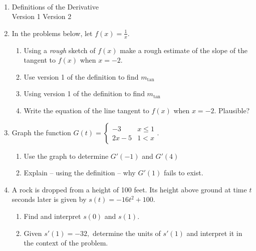 \documentclass[11pt,fleqn]{article}
\begin{document}
\renewcommand{\headrulewidth}{0pt}
\newcommand{\blank}[1]{\rule{#1}{0.75pt}}
\newcommand{\bc}{\begin{center}}
\newcommand{\ec}{\end{center}}
\renewcommand{\d}{\displaystyle}

\vspace*{-0.7in}

\begin{center}
  \large
  \\
\end{center}
\begin{enumerate}
\item Definitions of the Derivative \\
Version 1 \hspace{3in}Version 2\\

\vspace{0.7in}

\item In the problems below, let $f(x)=\frac{1}{x}.$
\begin{enumerate}
	\item Using a \emph{rough} sketch of $f(x)$ make a rough estimate of the slope of the tangent to $f(x)$ when $x=-2.$
	\vfill
	\item Use version 1 of the definition to find $m_{\text{tan}}$
	\vspace{2in}
	\item Using version 1 of the definition to find $m_{\text{tan}}$
	\vspace{2in}
	\item Write the equation of the line tangent to $f(x)$ when $x=-2$. Plausible?
	\vspace{.5in}
\end{enumerate}
\newpage
\item Graph the function $G(t) =\begin{cases} -3 & x \leq 1 \\ 2x-5 & 1 < x\end{cases}.$
\begin{enumerate}
	\item Use the graph to determine $G'(-1)$ and $G'(4)$
	\vfill
	\item Explain -- using the definition -- why $G'(1)$ fails to exist.
	\vfill
\end{enumerate}
\item A rock is dropped from a height of 100 feet. Its height above ground at time $t$ seconds later is given by $s(t)= -16t^2+100.$ 
	\begin{enumerate}
	\item Find and interpret $s(0)$ and $s(1).$
	\vfill
	\item Given $s'(1)=-32,$ determine the units of $s'(1)$ and interpret it in the context of the problem.
	\vfill
	\end{enumerate}
\end{enumerate}
\end{document}
